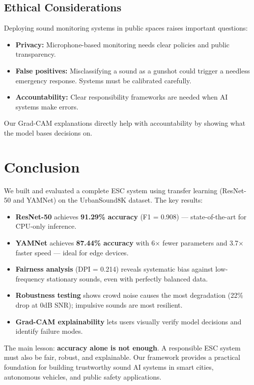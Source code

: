 \documentclass[11pt,a4paper]{article}
\begin{document}
\subsection{Ethical Considerations}

Deploying sound monitoring systems in public spaces raises important questions:
\begin{itemize}[noitemsep]
    \item \textbf{Privacy:} Microphone-based monitoring needs clear policies and public transparency.
    \item \textbf{False positives:} Misclassifying a sound as a gunshot could trigger a needless emergency response. Systems must be calibrated carefully.
    \item \textbf{Accountability:} Clear responsibility frameworks are needed when AI systems make errors.
\end{itemize}
Our Grad-CAM explanations directly help with accountability by showing what the model bases decisions on.

\section{\textcolor{iitjblue}{Conclusion}}

We built and evaluated a complete ESC system using transfer learning (ResNet-50 and YAMNet) on the UrbanSound8K dataset. The key results:

\begin{itemize}[noitemsep]
    \item \textbf{ResNet-50} achieves \textbf{91.29\% accuracy} (F1 = 0.908) — state-of-the-art for CPU-only inference.
    \item \textbf{YAMNet} achieves \textbf{87.44\% accuracy} with 6× fewer parameters and 3.7× faster speed — ideal for edge devices.
    \item \textbf{Fairness analysis} (DPI = 0.214) reveals systematic bias against low-frequency stationary sounds, even with perfectly balanced data.
    \item \textbf{Robustness testing} shows crowd noise causes the most degradation (22\% drop at 0dB SNR); impulsive sounds are most resilient.
    \item \textbf{Grad-CAM explainability} lets users visually verify model decisions and identify failure modes.
\end{itemize}

The main lesson: \textbf{accuracy alone is not enough}. A responsible ESC system must also be fair, robust, and explainable. Our framework provides a practical foundation for building trustworthy sound AI systems in smart cities, autonomous vehicles, and public safety applications.
\end{document}
